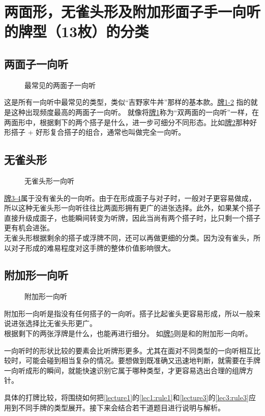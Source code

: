 \chapter[【一向听的技术】一向听的分类]{两面形，无雀头形及附加形面子手一向听的牌型（13枚）的分类}

\section{两面子一向听}
\begin{figure}[h]
    \caption{最常见的两面子一向听}
    \label{lec5:pai1-2}
    \par\bigskip
\end{figure}
这是所有一向听中最常见的类型，类似“吉野家牛丼”那样的基本款。\hyperref[lec5:pai1-2]{牌1-2}
指的就是这种出现频度最高的两面子一向听。
就像将\hyperref[lec5:pai1-2]{牌1}称为“双两面的一向听”一样，在两面形中，根据剩下的两个搭子是什么，进一步可细分不同形态。比如\hyperref[lec5:pai1-2]{牌2}那种好形搭子 + 好形复合搭子的组合，通常也叫做完全一向听。

\section{无雀头形}
\begin{figure}[h]
    \caption{无雀头形一向听}
    \label{lec5:pai3-4}
    \par\bigskip
\end{figure}
\hyperref[lec5:pai3-4]{牌3-4}属于没有雀头的一向听。由于在形成面子与对子时，一般对子更容易做成，所以这种无雀头形一向听往往比两面形拥有更广的进张选择。此外，如果某个搭子直接升级成面子，也能瞬间转变为听牌，因此当尚有两个搭子时，比只剩一个搭子更有机会进张。\\
无雀头形根据剩余的搭子或浮牌不同，还可以再做更细的分类。因为没有雀头，所以对子形成的难易程度对这手牌的整体价值影响很大。

\section{附加形一向听}
\begin{figure}[h]
    \caption{附加形一向听}
    \label{lec5:pai5}
\end{figure}
附加形一向听是指没有任何搭子的一向听。搭子比起雀头更容易形成，所以一般来说进张选择比无雀头形更广。\\
根据剩下的两张浮牌是什么，也能再进行细分。
如\hyperref[lec5:pai5]{牌5}则是和的附加形一向听。

一向听时的形状比较的要素会比听牌形更多。尤其在面对不同类型的一向听相互比较时，可能会碰到相当复杂的情况。要想做到既准确又迅速地判断，就需要在手牌一向听成形的瞬间，就能快速识别它属于哪种类型，才更容易选出合理的组牌方针。

具体的打牌比较，将围绕如何把\ref{lecture1}的\ref{lec1:rule1}和\ref{lecture3}的\ref{lec3:rule3}应用到不同手牌的类型展开。接下来会结合若干道题目进行说明与解析。